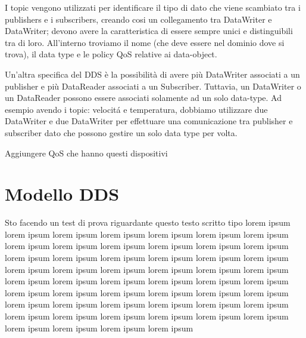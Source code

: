 I topic vengono utilizzati per identificare il tipo di dato che viene
scambiato tra i publishers e i subscribers, creando cosi un collegamento
tra DataWriter e DataWriter;\cite{topicomg}
devono avere la caratteristica di essere sempre unici e 
distinguibili tra di loro. All'interno troviamo il nome 
(che deve essere nel dominio dove si trova),
il data type e le policy QoS relative ai data-object.

Un'altra specifica del DDS è la possibilità di avere 
più DataWriter associati a un publisher e più DataReader associati a 
un Subscriber. Tuttavia, un DataWriter o un DataReader possono essere 
associati solamente ad un solo data-type.
Ad esempio avendo i topic: velocitá e temperatura, dobbiamo utilizzare
due DataWriter e due DataWriter per effettuare una comunicazione tra
publisher e subscriber dato che possono gestire un solo data type per volta.





Aggiungere QoS che hanno questi dispositivi
\cite{dds1.4}

\section{Modello DDS}
Sto facendo un test di prova riguardante questo testo scritto
tipo lorem ipsum lorem ipsum lorem ipsum lorem ipsum lorem ipsum
lorem ipsum lorem ipsum lorem ipsum lorem ipsum lorem ipsum lorem ipsum
lorem ipsum lorem ipsum lorem ipsum lorem ipsum lorem ipsum lorem ipsum
lorem ipsum lorem ipsum lorem ipsum lorem ipsum lorem ipsum lorem ipsum
lorem ipsum lorem ipsum lorem ipsum lorem ipsum lorem ipsum lorem ipsum
lorem ipsum lorem ipsum lorem ipsum lorem ipsum lorem ipsum lorem ipsum
lorem ipsum lorem ipsum lorem ipsum lorem ipsum lorem ipsum lorem ipsum
lorem ipsum lorem ipsum lorem ipsum lorem ipsum lorem ipsum lorem ipsum
lorem ipsum lorem ipsum lorem ipsum lorem ipsum lorem ipsum lorem ipsum